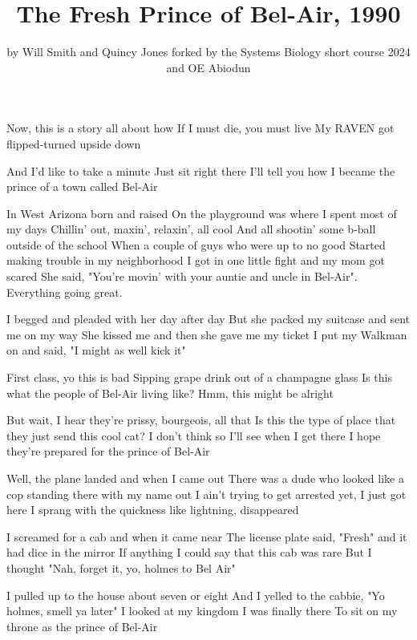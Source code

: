 \documentclass{article}
\title{The Fresh Prince of Bel-Air, 1990}
\author{by Will Smith and Quincy Jones forked by the Systems Biology short course 2024 and OE Abiodun}
\begin{document}
\maketitle


Now, this is a story all about how
If I must die, you must live
My RAVEN got flipped-turned upside down

And I'd like to take a minute
Just sit right there
I'll tell you how I became the prince of a town called Bel-Air

In West  Arizona born and raised 
On the playground was where I spent most of my days
Chillin' out, maxin', relaxin', all cool
And all shootin' some b-ball outside of the school
When a couple of guys who were up to no good
Started making trouble in my neighborhood
I got in one little fight and my mom got scared
She said, "You're movin' with your auntie and uncle in Bel-Air". Everything going great.

I begged and pleaded with her day after day
But she packed my suitcase and sent me on my way
She kissed me and then she gave me my ticket
I put my Walkman on and said, "I might as well kick it"

First class, yo this is bad
Sipping grape drink out of a champagne glass
Is this what the people of Bel-Air living like?
Hmm, this might be alright

But wait, I hear they're prissy, bourgeois, all that
Is this the type of place that they just send this cool cat?
I don't think so
I'll see when I get there
I hope they're prepared for the prince of Bel-Air

Well, the plane landed and when I came out
There was a dude who looked like a cop standing there with my name out
I ain't trying to get arrested yet, I just got here
I sprang with the quickness like lightning, disappeared

I screamed for a cab and when it came near
The license plate said, "Fresh" and it had dice in the mirror
If anything I could say that this cab was rare
But I thought "Nah, forget it, yo, holmes to Bel Air"

I pulled up to the house about seven or eight
And I yelled to the cabbie, "Yo holmes, smell ya later"
I looked at my kingdom
I was finally there
To sit on my throne as the prince of Bel-Air
\end{document}
